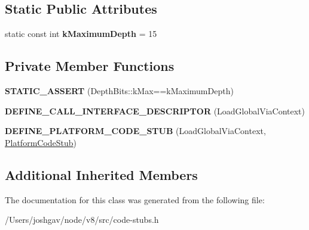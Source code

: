 \subsection*{Static Public Attributes}
\begin{DoxyCompactItemize}
\item 
static const int {\bfseries k\+Maximum\+Depth} = 15\hypertarget{classv8_1_1internal_1_1_load_global_via_context_stub_aebf34def6d9388619dbe44700d49f1d6}{}\label{classv8_1_1internal_1_1_load_global_via_context_stub_aebf34def6d9388619dbe44700d49f1d6}

\end{DoxyCompactItemize}
\subsection*{Private Member Functions}
\begin{DoxyCompactItemize}
\item 
{\bfseries S\+T\+A\+T\+I\+C\+\_\+\+A\+S\+S\+E\+RT} (Depth\+Bits\+::k\+Max==k\+Maximum\+Depth)\hypertarget{classv8_1_1internal_1_1_load_global_via_context_stub_a14c04a255972963b7ac61ad806b8f91f}{}\label{classv8_1_1internal_1_1_load_global_via_context_stub_a14c04a255972963b7ac61ad806b8f91f}

\item 
{\bfseries D\+E\+F\+I\+N\+E\+\_\+\+C\+A\+L\+L\+\_\+\+I\+N\+T\+E\+R\+F\+A\+C\+E\+\_\+\+D\+E\+S\+C\+R\+I\+P\+T\+OR} (Load\+Global\+Via\+Context)\hypertarget{classv8_1_1internal_1_1_load_global_via_context_stub_a00c30089d0ced4c56c92a2a0ffac29a6}{}\label{classv8_1_1internal_1_1_load_global_via_context_stub_a00c30089d0ced4c56c92a2a0ffac29a6}

\item 
{\bfseries D\+E\+F\+I\+N\+E\+\_\+\+P\+L\+A\+T\+F\+O\+R\+M\+\_\+\+C\+O\+D\+E\+\_\+\+S\+T\+UB} (Load\+Global\+Via\+Context, \hyperlink{classv8_1_1internal_1_1_platform_code_stub}{Platform\+Code\+Stub})\hypertarget{classv8_1_1internal_1_1_load_global_via_context_stub_a16cc6db299a6b2668fa8a5c43e4b2c4d}{}\label{classv8_1_1internal_1_1_load_global_via_context_stub_a16cc6db299a6b2668fa8a5c43e4b2c4d}

\end{DoxyCompactItemize}
\subsection*{Additional Inherited Members}


The documentation for this class was generated from the following file\+:\begin{DoxyCompactItemize}
\item 
/\+Users/joshgav/node/v8/src/code-\/stubs.\+h\end{DoxyCompactItemize}
